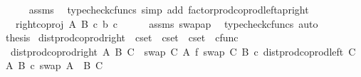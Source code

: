 \begin{isabellebody}
\ \ \ \ \isamarkupfalse%
\ assms\ \isamarkupfalse%
\ {\isacharparenleft}{\kern0pt}typecheck{\isacharunderscore}{\kern0pt}cfuncs{\isacharcomma}{\kern0pt}\ simp\ add{\isacharcolon}{\kern0pt}\ factor{\isacharunderscore}{\kern0pt}prod{\isacharunderscore}{\kern0pt}coprod{\isacharunderscore}{\kern0pt}left{\isacharunderscore}{\kern0pt}ap{\isacharunderscore}{\kern0pt}right{\isacharparenright}{\kern0pt}\isanewline
\ \ \isamarkupfalse%
\ \isamarkupfalse%
\ {\isachardoublequoteopen}{\isachardot}{\kern0pt}{\isachardot}{\kern0pt}{\isachardot}{\kern0pt}\ {\isacharequal}{\kern0pt}\ {\isasymlangle}right{\isacharunderscore}{\kern0pt}coproj\ A\ B\ {\isasymcirc}\isactrlsub c\ b{\isacharcomma}{\kern0pt}\ c{\isasymrangle}{\isachardoublequoteclose}\isanewline
\ \ \ \ \isamarkupfalse%
\ assms\ swap{\isacharunderscore}{\kern0pt}ap\ \isamarkupfalse%
\ {\isacharparenleft}{\kern0pt}typecheck{\isacharunderscore}{\kern0pt}cfuncs{\isacharcomma}{\kern0pt}\ auto{\isacharparenright}{\kern0pt}\isanewline
\ \ \isamarkupfalse%
\ \isamarkupfalse%
\ {\isacharquery}{\kern0pt}thesis\isacommand{{\isachardot}{\kern0pt}}\isamarkupfalse%
\isanewline
{}\isamarkupfalse%
%
\endisatagproof
{\isafoldproof}%
%
\isadelimproof
%
\endisadelimproof
%
\isadelimdocument
%
\endisadelimdocument
%
\isatagdocument
%
\isamarkuptrue%
%
\endisatagdocument
{\isafolddocument}%
%
\isadelimdocument
%
\endisadelimdocument
{}\isamarkupfalse%
\ dist{\isacharunderscore}{\kern0pt}prod{\isacharunderscore}{\kern0pt}coprod{\isacharunderscore}{\kern0pt}right\ {\isacharcolon}{\kern0pt}{\isacharcolon}{\kern0pt}\ {\isachardoublequoteopen}cset\ {\isasymRightarrow}\ cset\ {\isasymRightarrow}\ cset\ {\isasymRightarrow}\ cfunc{\isachardoublequoteclose}\ \isanewline
\ \ {\isachardoublequoteopen}dist{\isacharunderscore}{\kern0pt}prod{\isacharunderscore}{\kern0pt}coprod{\isacharunderscore}{\kern0pt}right\ A\ B\ C\ {\isacharequal}{\kern0pt}\ {\isacharparenleft}{\kern0pt}swap\ C\ A\ {\isasymbowtie}\isactrlsub f\ swap\ C\ B{\isacharparenright}{\kern0pt}\ {\isasymcirc}\isactrlsub c\ dist{\isacharunderscore}{\kern0pt}prod{\isacharunderscore}{\kern0pt}coprod{\isacharunderscore}{\kern0pt}left\ C\ A\ B\ {\isasymcirc}\isactrlsub c\ swap\ {\isacharparenleft}{\kern0pt}A\ {\isasymCoprod}\ B{\isacharparenright}{\kern0pt}\ C{\isachardoublequoteclose}\isanewline
\isanewline
{}\isamarkupfalse%

\end{isabellebody}
